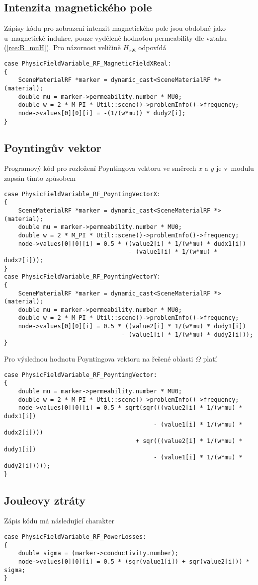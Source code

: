 \subsection*{Intenzita magnetického pole}
Zápisy kódu pro zobrazení intenzit magnetického pole jsou obdobné jako u~magnetické indukce, pouze vydělené hodnotou permeability dle vztahu (\ref{rce:B_muH}).
Pro názornost veličině $H_{x\Re}$ odpovídá
\begin{verbatim}
case PhysicFieldVariable_RF_MagneticFieldXReal:
{
    SceneMaterialRF *marker = dynamic_cast<SceneMaterialRF *>(material);
    double mu = marker->permeability.number * MU0;
    double w = 2 * M_PI * Util::scene()->problemInfo()->frequency;
    node->values[0][0][i] = -(1/(w*mu)) * dudy2[i];
}
\end{verbatim}

\subsection*{Poyntingův vektor}
Programový kód pro rozložení Poyntingova vektoru ve směrech $x$ a $y$ je v~modulu zapsán tímto způsobem
\begin{verbatim}
case PhysicFieldVariable_RF_PoyntingVectorX:
{
    SceneMaterialRF *marker = dynamic_cast<SceneMaterialRF *>(material);
    double mu = marker->permeability.number * MU0;
    double w = 2 * M_PI * Util::scene()->problemInfo()->frequency;
    node->values[0][0][i] = 0.5 * ((value2[i] * 1/(w*mu) * dudx1[i]) 
                                   - (value1[i] * 1/(w*mu) * dudx2[i]));
}
case PhysicFieldVariable_RF_PoyntingVectorY:
{
    SceneMaterialRF *marker = dynamic_cast<SceneMaterialRF *>(material);
    double mu = marker->permeability.number * MU0;
    double w = 2 * M_PI * Util::scene()->problemInfo()->frequency;
    node->values[0][0][i] = 0.5 * ((value2[i] * 1/(w*mu) * dudy1[i]) 
                                 - (value1[i] * 1/(w*mu) * dudy2[i]));
}
\end{verbatim}
Pro výslednou hodnotu Poyntingova vektoru na řešené oblasti $\Omega$ platí
\begin{verbatim}
case PhysicFieldVariable_RF_PoyntingVector:
{
    double mu = marker->permeability.number * MU0;
    double w = 2 * M_PI * Util::scene()->problemInfo()->frequency;
    node->values[0][0][i] = 0.5 * sqrt(sqr(((value2[i] * 1/(w*mu) * dudx1[i]) 
                                          - (value1[i] * 1/(w*mu) * dudx2[i]))) 
                                     + sqr(((value2[i] * 1/(w*mu) * dudy1[i]) 
                                          - (value1[i] * 1/(w*mu) * dudy2[i]))));
}
\end{verbatim}

\subsection*{Jouleovy ztráty}
Zápis kódu má následující charakter
\begin{verbatim}
case PhysicFieldVariable_RF_PowerLosses:
{
    double sigma = (marker->conductivity.number);
    node->values[0][0][i] = 0.5 * (sqr(value1[i]) + sqr(value2[i])) * sigma;
}
\end{verbatim}
